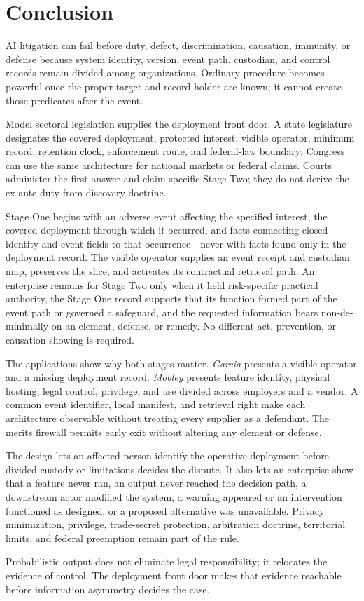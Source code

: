 \section*{Conclusion}
\label{sec:conclusion}

AI litigation can fail before duty, defect, discrimination, causation, immunity, or defense because system identity, version, event path, custodian, and control records remain divided among organizations. Ordinary procedure becomes powerful once the proper target and record holder are known; it cannot create those predicates after the event.

Model sectoral legislation supplies the deployment front door. A state legislature designates the covered deployment, protected interest, visible operator, minimum record, retention clock, enforcement route, and federal-law boundary; Congress can use the same architecture for national markets or federal claims. Courts administer the first answer and claim-specific Stage Two; they do not derive the ex ante duty from discovery doctrine.

Stage One begins with an adverse event affecting the specified interest, the covered deployment through which it occurred, and facts connecting closed identity and event fields to that occurrence---never with facts found only in the deployment record. The visible operator supplies an event receipt and custodian map, preserves the slice, and activates its contractual retrieval path. An enterprise remains for Stage Two only when it held risk-specific practical authority, the Stage One record supports that its function formed part of the event path or governed a safeguard, and the requested information bears non-de-minimally on an element, defense, or remedy. No different-act, prevention, or causation showing is required.

The applications show why both stages matter. \emph{Garcia} presents a visible operator and a missing deployment record. \emph{Mobley} presents feature identity, physical hosting, legal control, privilege, and use divided across employers and a vendor. A common event identifier, local manifest, and retrieval right make each architecture observable without treating every supplier as a defendant. The merits firewall permits early exit without altering any element or defense.

The design lets an affected person identify the operative deployment before divided custody or limitations decides the dispute. It also lets an enterprise show that a feature never ran, an output never reached the decision path, a downstream actor modified the system, a warning appeared or an intervention functioned as designed, or a proposed alternative was unavailable. Privacy minimization, privilege, trade-secret protection, arbitration doctrine, territorial limits, and federal preemption remain part of the rule.

Probabilistic output does not eliminate legal responsibility; it relocates the evidence of control. The deployment front door makes that evidence reachable before information asymmetry decides the case.
